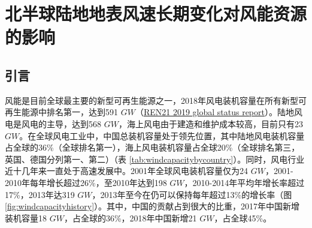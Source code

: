 \chapter{北半球陆地地表风速长期变化对风能资源的影响}\label{chap:windenergychange}

\section{引言}

风能是目前全球最主要的新型可再生能源之一，2018年风电装机容量在所有新型可再生能源中排名第一，达到591 $GW$（\href{https://www.ren21.net/wp-content/uploads/2019/05/gsr_2019_full_report_en.pdf}{REN21 2019 global status report}）。陆地风电是风电的主导，达到568 $GW$，海上风电由于建造和维护成本较高，目前只有23 $GW$。在全球风电工业中，中国总装机容量处于领先位置，其中陆地风电装机容量占全球的36\%（全球排名第一），海上风电装机容量占全球20\%（全球排名第三，英国、德国分列第一、第二）（表 \ref{tab:windcapacitybycountry}）。同时，风电行业近十几年来一直处于高速发展中。2001年全球风电装机容量仅为24 $GW$，2001-2010年每年增长超过26\%，至2010年达到198 $GW$，2010-2014年平均年增长率超过17\%，2013年达319 $GW$，2013年至今在仍可以保持每年超过13\%的增长率（图 \ref{fig:windcapacityhistory}）。其中，中国的贡献占到很大的比重，2017年中国新增装机容量18 $GW$，占全球的36\%，2018年中国新增21 $GW$，占全球45\%。

